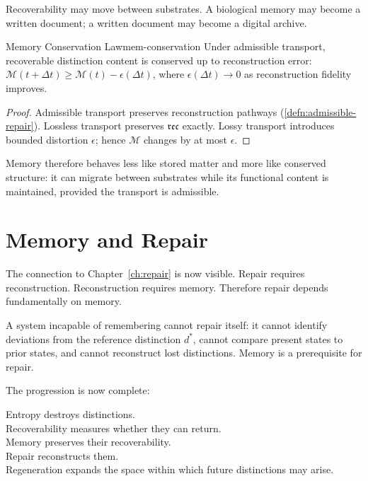 \documentclass[12pt,twoside,openright]{book}
\newcommand{\reco}{\mathfrak{rec}}
\begin{document}
Recoverability may move between substrates. A biological
memory may become a written document; a written document
may become a digital archive.

\begin{theorem}{Memory Conservation Law}{mem-conservation}
  Under admissible transport, recoverable distinction
  content is conserved up to reconstruction error:
  $\mathcal{M}(t + \Delta t) \ge \mathcal{M}(t) -
  \epsilon(\Delta t)$, where $\epsilon(\Delta t) \to 0$
  as reconstruction fidelity improves.
\end{theorem}

\begin{proof}
  Admissible transport preserves reconstruction pathways
  (\cref{defn:admissible-repair}). Lossless transport
  preserves $\reco$ exactly. Lossy transport introduces
  bounded distortion $\epsilon$; hence $\mathcal{M}$
  changes by at most $\epsilon$.
\end{proof}

Memory therefore behaves less like stored matter and more
like conserved structure: it can migrate between substrates
while its functional content is maintained, provided the
transport is admissible.

\section{Memory and Repair}
\label{sec:ch6-repair}

The connection to Chapter~\ref{ch:repair} is now visible.
Repair requires reconstruction. Reconstruction requires
memory. Therefore repair depends fundamentally on memory.

A system incapable of remembering cannot repair itself:
it cannot identify deviations from the reference
distinction $d^*$, cannot compare present states to prior
states, and cannot reconstruct lost distinctions. Memory
is a prerequisite for repair.

The progression is now complete:
\begin{center}
Entropy destroys distinctions.\\
Recoverability measures whether they can return.\\
Memory preserves their recoverability.\\
Repair reconstructs them.\\
Regeneration expands the space within which future
distinctions may arise.
\end{center}
\end{document}
